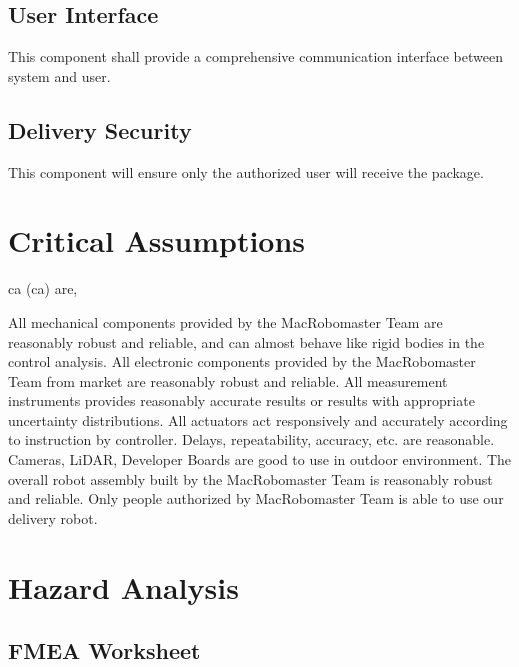 \documentclass{article}
\begin{document}
\subsection{User Interface}
This component shall provide a comprehensive communication interface between system and user. 
\subsection{Delivery Security}
This component will ensure only the authorized user will receive the package. 

\section{Critical Assumptions}
\glsdesc{ca} (\gls{ca}) are,
\begin{outline}[enumerate]
\1 All mechanical components provided by the MacRobomaster Team are reasonably robust and reliable, and can almost behave like rigid bodies in the control analysis.
\1 All electronic components provided by the MacRobomaster Team from market are reasonably robust and reliable.
    \2 All measurement instruments provides reasonably accurate results or results with appropriate uncertainty distributions.
    \2 All actuators act responsively and accurately according to instruction by controller. Delays, repeatability, accuracy, etc. are reasonable. 
    \2 Cameras, LiDAR, Developer Boards are good to use in outdoor environment. 
\1 The overall robot assembly built by the MacRobomaster Team is reasonably robust and reliable.
\1 Only people authorized by MacRobomaster Team is able to use our delivery robot. 
\end{outline}

\section{Hazard Analysis}
\subsection{FMEA Worksheet}
\end{document}
